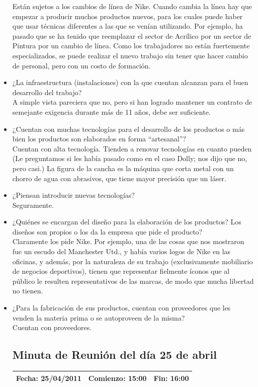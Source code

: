 \documentclass[a4paper,10pt,titlepage]{article}
\begin{document}
\begin{itemize}
Est\'an sujetos a los cambios de l\'inea de Nike. Cuando cambia la l\'inea hay que empezar a producir muchos productos nuevos,
 para los cuales puede haber que usar t\'ecnicas diferentes a las que se ven\'ian utilizando. 
Por ejemplo, ha pasado que se ha tenido que reemplazar el sector de Acr\'ilico por un sector de Pintura por un cambio de l\'inea. 
Como los trabajadores no est\'an fuertemente especializados, se puede realizar el nuevo trabajo sin tener que hacer cambio de personal, pero con un costo de formaci\'on.
\item ¿La infraestructura (instalaciones) con la que cuentan alcanzan para el buen desarrollo del trabajo? \\
 A simple vista pareciera que no, pero si han logrado mantener un contrato de semejante exigencia durante m\'as de 11 años, debe ser suficiente.
\item ¿Cuentan con muchas tecnolog\'ias para el desarrollo de los productos o m\'as bien los productos son elaborados en forma ``artesanal''? \\
Cuentan con alta tecnolog\'ia. Tienden a renovar tecnolog\'ias en cuanto pueden (Le preguntamos si les hab\'ia pasado como en el caso Dolly; nos dijo que no, pero casi.) La figura de la cancha es la m\'aquina que corta metal con un chorro de agua con abrasivos, que tiene mayor precisi\'on que un l\'aser.
\item ¿Piensan introducir nuevas tecnolog\'ias? \\
Seguramente.
\item ¿Qui\'enes se encargan del diseño para la elaboraci\'on de los productos? Los diseños son propios o los da la empresa que pide el producto? \\
Claramente los pide Nike. Por ejemplo, una de las cosas que nos mostraron fue un escudo del Manchester Utd., y hab\'ia varios logos de Nike en las oficinas, 
y adem\'as, por la naturaleza de su trabajo (exclusivamente mobiliario de negocios deportivos), tienen que representar fielmente \'iconos que al p\'ublico le resulten 
representativos de las marcas, de modo que mucha libertad no tienen.
\item ¿Para la fabricaci\'on de sus productos, cuentan con proveedores que les venden la materia prima o se autoproveen de la misma? \\
Cuentan con proveedores. 

\newpage

\subsection{Minuta de Reuni\'on del d\'ia 25 de abril}
\vspace{1cm}
\begin{center}
\begin{tabular}{|c|c|c|}
	\hline
	\textbf{Fecha:} 25/04/2011 &  \textbf{Comienzo:} 15:00  &  \textbf{Fin:} 16:00 \\ \hline	


\end{tabular}
\end{center}
\end{itemize}
\end{document}
